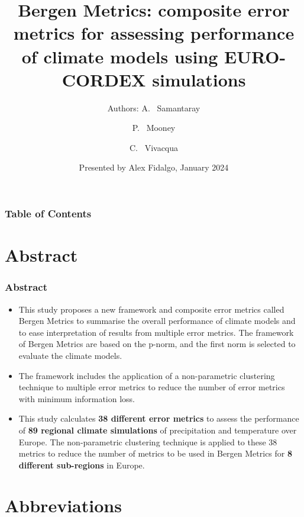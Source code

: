 \documentclass[xcolor={dvipsnames}]{beamer}
\title[] %
{Bergen Metrics: composite error metrics for assessing performance of climate models using EURO-CORDEX simulations}
\author[] %
{Authors: A. ~Samantaray \and P. ~Mooney \and C. ~Vivacqua}
\institute[VFU] %
{ 
  Norwegian Research Centre (Norce), Norway\\
  \and
  Bjerknes Centre for Climate Research, Norway\\
  \and
  Federal University at Rio Grande do Norte, Brazil\\
}
\date[VLC 2021] %
{Presented by Alex Fidalgo, January 2024}
\begin{document}
\frame{\titlepage}


\begin{frame}
\frametitle{Table of Contents}
\begin{multicols}{2}
\tableofcontents
\end{multicols}
\end{frame}


\section{Abstract}
\begin{frame}
\frametitle{Abstract}

\begin{itemize}
    \item<1-> This study proposes a new framework and composite error metrics called Bergen Metrics to summarise the overall performance of climate models and to ease interpretation of results from multiple error metrics. The framework of Bergen Metrics are based on the p-norm, and the first norm is selected to evaluate the climate models. \newline

    \item<2-> The framework includes the application of a non-parametric clustering technique to multiple error metrics to reduce the number of error metrics with minimum information loss. \newline

    \item<3> This study calculates \textbf{38 different error metrics} to assess the performance of \textbf{89 regional climate simulations} of precipitation and temperature over Europe. The non-parametric clustering technique is applied to these 38 metrics to reduce the number of metrics to be used in Bergen Metrics for \textbf{8 different sub-regions} in Europe.
\end{itemize}

\end{frame}

\section{Abbreviations}
\end{document}
